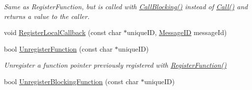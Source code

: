 \begin{DoxyCompactItemize}
\begin{DoxyCompactList}\small\item\em Same as {\itshape Register\-Function}, but is called with \hyperlink{class_rak_net_1_1_r_p_c4_ac224d0d8b1f23817488c14b9fe2d2d36}{Call\-Blocking()} instead of \hyperlink{class_rak_net_1_1_r_p_c4_afcf702778c734ec2cd0a0513e77fb380}{Call()} and returns a value to the caller. \end{DoxyCompactList}\item 
void \hyperlink{class_rak_net_1_1_r_p_c4_a71f5f6d32e12adf3715d9c5faea25439}{Register\-Local\-Callback} (const char $\ast$unique\-I\-D, \hyperlink{namespace_rak_net_a1b2f3bf4bad2bb6a8360a12295fbed0c}{Message\-I\-D} message\-Id)
\item 
bool \hyperlink{class_rak_net_1_1_r_p_c4_ac2fe5e7ffa410c7203e15e1885c72e73}{Unregister\-Function} (const char $\ast$unique\-I\-D)
\begin{DoxyCompactList}\small\item\em Unregister a function pointer previously registered with \hyperlink{class_rak_net_1_1_r_p_c4_a62122f90344dbfc064f9b14e0f565b23}{Register\-Function()} \end{DoxyCompactList}\item 
\hypertarget{class_rak_net_1_1_r_p_c4_a423aadb8573fe7a91fdc3bd2dacd3bf8}{bool \hyperlink{class_rak_net_1_1_r_p_c4_a423aadb8573fe7a91fdc3bd2dacd3bf8}{Unregister\-Blocking\-Function} (const char $\ast$unique\-I\-D)}\label{class_rak_net_1_1_r_p_c4_a423aadb8573fe7a91fdc3bd2dacd3bf8}


\end{DoxyCompactItemize}
